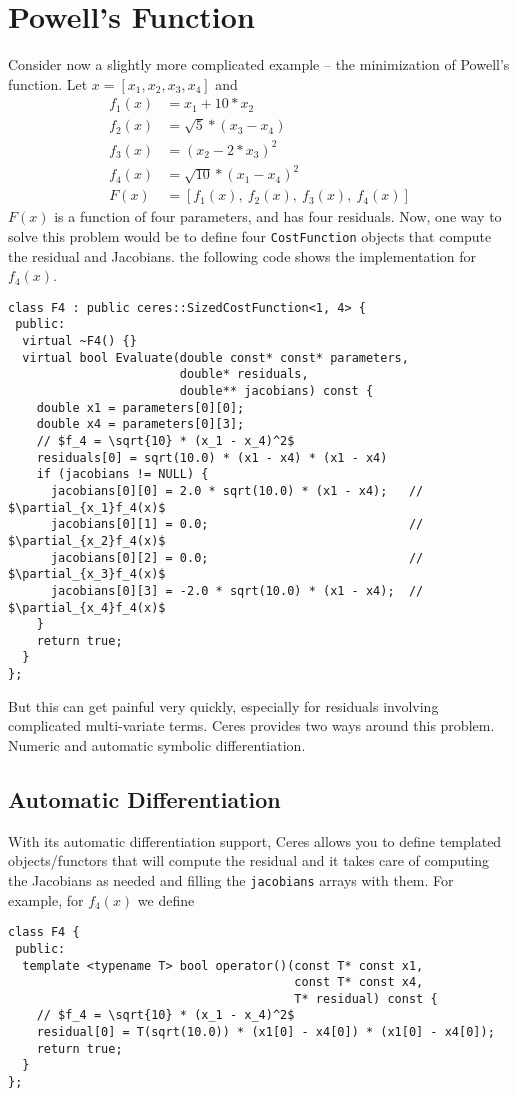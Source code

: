 \chapter{Powell's Function}
\label{chapter:tutorial:powell}
Consider now a slightly more complicated example -- the minimization of Powell's function. Let $x = \left[x_1, x_2, x_3, x_4 \right]$ and
\begin{align}
   f_1(x) &= x_1 + 10*x_2 \\
   f_2(x) &= \sqrt{5} * (x_3 - x_4)\\
   f_3(x) &= (x_2 - 2*x_3)^2\\
   f_4(x) &= \sqrt{10} * (x_1 - x_4)^2\\
	F(x) & = \left[f_1(x),\ f_2(x),\ f_3(x),\ f_4(x) \right]
\end{align}
$F(x)$ is a function of four parameters, and has four residuals. Now,
one way to solve this problem would be to define four
\texttt{CostFunction} objects that compute the residual and Jacobians. \eg the following code shows the implementation for $f_4(x)$.
\begin{verbatim}
class F4 : public ceres::SizedCostFunction<1, 4> {
 public:
  virtual ~F4() {}
  virtual bool Evaluate(double const* const* parameters,
                        double* residuals,
                        double** jacobians) const {
    double x1 = parameters[0][0];
    double x4 = parameters[0][3];
    // $f_4 = \sqrt{10} * (x_1 - x_4)^2$
    residuals[0] = sqrt(10.0) * (x1 - x4) * (x1 - x4)
    if (jacobians != NULL) {
      jacobians[0][0] = 2.0 * sqrt(10.0) * (x1 - x4);   // $\partial_{x_1}f_4(x)$
      jacobians[0][1] = 0.0;                            // $\partial_{x_2}f_4(x)$
      jacobians[0][2] = 0.0;                            // $\partial_{x_3}f_4(x)$
      jacobians[0][3] = -2.0 * sqrt(10.0) * (x1 - x4);  // $\partial_{x_4}f_4(x)$
    }
    return true;
  }
};
\end{verbatim}

But this can get painful very quickly, especially for residuals involving complicated multi-variate terms. Ceres provides two ways around this problem. Numeric and automatic symbolic differentiation.

\section{Automatic Differentiation}
\label{sec:tutorial:autodiff}
With its automatic differentiation support, Ceres allows you to define templated objects/functors that will compute the residual and it takes care of computing the Jacobians as needed and filling the \texttt{jacobians} arrays with them. For example, for $f_4(x)$ we define
\begin{verbatim}
class F4 {
 public:
  template <typename T> bool operator()(const T* const x1,
                                        const T* const x4,
                                        T* residual) const {
    // $f_4 = \sqrt{10} * (x_1 - x_4)^2$
    residual[0] = T(sqrt(10.0)) * (x1[0] - x4[0]) * (x1[0] - x4[0]);
    return true;
  }
};
\end{verbatim}


